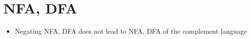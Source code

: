 \chapter{NFA, DFA}

\begin{itemize}
  \item Negating NFA, DFA does not lead to NFA, DFA of the complement language
\end{itemize}
